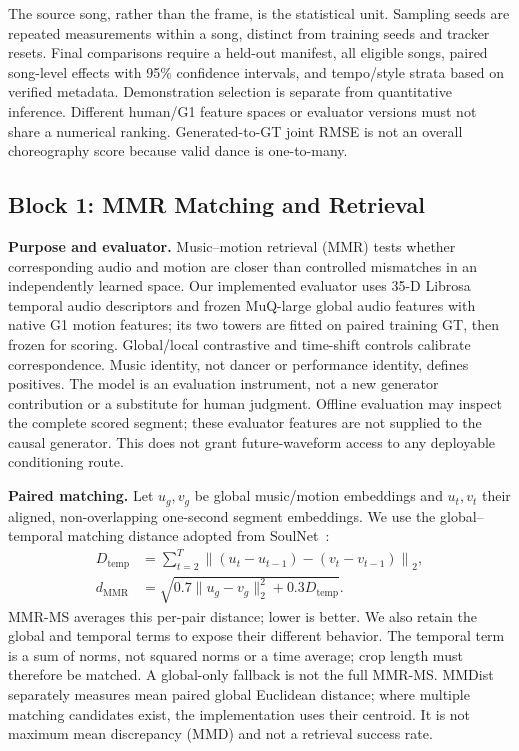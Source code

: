 The source song, rather than the frame, is the statistical unit. Sampling seeds
are repeated measurements within a song, distinct from training seeds and
tracker resets. Final comparisons require a held-out manifest, all eligible
songs, paired song-level effects with 95\% confidence intervals, and tempo/style
strata based on verified metadata. Demonstration selection is separate from
quantitative inference. Different human/G1 feature spaces or evaluator versions
must not share a numerical ranking. Generated-to-GT joint RMSE is not an overall
choreography score because valid dance is one-to-many.

\subsection{Block 1: MMR Matching and Retrieval}
\textbf{Purpose and evaluator.} Music--motion retrieval (MMR) tests whether
corresponding audio and motion are closer than controlled mismatches in an
independently learned space. Our implemented evaluator uses 35-D Librosa
temporal audio descriptors and frozen MuQ-large global audio features with
native G1 motion features; its two towers
are fitted on paired training GT, then frozen for scoring. Global/local
contrastive and time-shift controls calibrate correspondence. Music identity,
not dancer or performance identity, defines positives. The model is an
evaluation instrument, not a new generator contribution or a substitute for
human judgment. Offline evaluation may inspect the complete scored segment;
these evaluator features are not supplied to the causal generator. This does
not grant future-waveform access to any deployable conditioning route.

\textbf{Paired matching.} Let $u_g,v_g$ be global music/motion embeddings and
$u_t,v_t$ their aligned, non-overlapping one-second segment embeddings. We use
the global--temporal matching distance adopted from SoulNet~\cite{li2025soulnet}:
\begin{align}
 D_{\mathrm{temp}} &= \sum_{t=2}^{T}
 \left\|(u_t-u_{t-1})-(v_t-v_{t-1})\right\|_2,\\
 d_{\mathrm{MMR}} &=
 \sqrt{0.7\|u_g-v_g\|_2^2+0.3D_{\mathrm{temp}}}.
 \label{eq:mmr_score}
\end{align}
MMR-MS averages this per-pair distance; lower is better. We also retain the
global and temporal terms to expose their different behavior. The temporal
term is a sum of norms, not squared norms or a time average; crop length must
therefore be matched. A global-only fallback is not the full MMR-MS.
MMDist separately measures mean paired global Euclidean distance; where
multiple matching candidates exist, the implementation uses their centroid.
It is not maximum mean discrepancy (MMD) and not a retrieval success rate.

